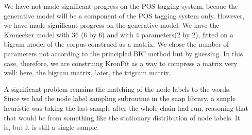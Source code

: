 \documentclass[12pt]{article}
\begin{document}
We have not made significant progress on the POS tagging system, becaue the generative model will be a component of the POS tagging system only. However, we have made significant progress on the generative model. We have the Kronecker model with 36 (6 by 6) and with 4 parameters(2 by 2), fitted on a bigram model of the corpus construed as a matrix. We chose the number of parameters not according to the principled BIC method but by guessing. In this case, therefore, we are construing KronFit as a way to compress a matrix very well: here, the bigram matrix, later, the trigram matrix.

A significant problem remains the matching of the node labels to the words. Since we had the node label sampling subroutine in the snap library, a simple heuristic was taking the last sample after the whole chain had run, reasoning that that would be from something like the stationary distribution of node labels. It is, but it is still a single sample.
\end{document}
